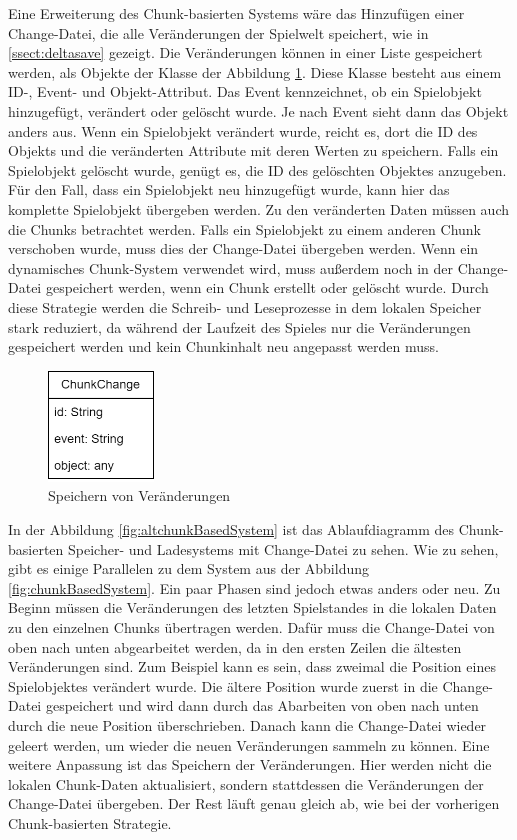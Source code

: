 Eine Erweiterung des Chunk-basierten Systems wäre das Hinzufügen einer Change-Datei, die alle Veränderungen der Spielwelt speichert, wie in \ref{ssect:deltasave} gezeigt. Die Veränderungen können in einer Liste gespeichert werden, als Objekte der Klasse der Abbildung \ref{fig:changesClass}. Diese Klasse besteht aus einem ID-, Event- und Objekt-Attribut. Das Event kennzeichnet, ob ein Spielobjekt hinzugefügt, verändert oder gelöscht wurde. Je nach Event sieht dann das Objekt anders aus. Wenn ein Spielobjekt verändert wurde, reicht es, dort die ID des Objekts und die veränderten Attribute mit deren Werten zu speichern. Falls ein Spielobjekt gelöscht wurde, genügt es, die ID des gelöschten Objektes anzugeben. Für den Fall, dass ein Spielobjekt neu hinzugefügt wurde, kann hier das komplette Spielobjekt übergeben werden. Zu den veränderten Daten müssen auch die Chunks betrachtet werden. Falls ein Spielobjekt zu einem anderen Chunk verschoben wurde, muss dies der Change-Datei übergeben werden. Wenn ein dynamisches Chunk-System verwendet wird, muss außerdem noch in der Change-Datei gespeichert werden, wenn ein Chunk erstellt oder gelöscht wurde. Durch diese Strategie werden die Schreib- und Leseprozesse in dem lokalen Speicher stark reduziert, da während der Laufzeit des Spieles nur die Veränderungen gespeichert werden und kein Chunkinhalt neu angepasst werden muss.

\begin{figure}[htp]
    \centering
    \includegraphics[width=0.25\textwidth]{images/Changes.png}
    \caption{Speichern von Veränderungen}
    \label{fig:changesClass}
\end{figure}

In der Abbildung \ref{fig:altchunkBasedSystem} ist das Ablaufdiagramm des Chunk-basierten Speicher- und Ladesystems mit Change-Datei zu sehen. Wie zu sehen, gibt es einige Parallelen zu dem System aus der Abbildung \ref{fig:chunkBasedSystem}. Ein paar Phasen sind jedoch etwas anders oder neu. Zu Beginn müssen die Veränderungen des letzten Spielstandes in die lokalen Daten zu den einzelnen Chunks übertragen werden. Dafür muss die Change-Datei von oben nach unten abgearbeitet werden, da in den ersten Zeilen die ältesten Veränderungen sind. Zum Beispiel kann es sein, dass zweimal die Position eines Spielobjektes verändert wurde. Die ältere Position wurde zuerst in die Change-Datei gespeichert und wird dann durch das Abarbeiten von oben nach unten durch die neue Position überschrieben. Danach kann die Change-Datei wieder geleert werden, um wieder die neuen Veränderungen sammeln zu können. Eine weitere Anpassung ist das Speichern der Veränderungen. Hier werden nicht die lokalen Chunk-Daten aktualisiert, sondern stattdessen die Veränderungen der Change-Datei übergeben. Der Rest läuft genau gleich ab, wie bei der vorherigen Chunk-basierten Strategie.

